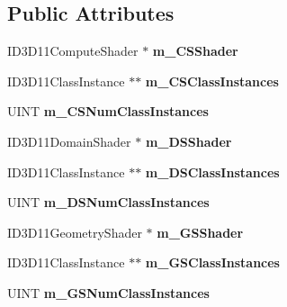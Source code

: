 \subsection*{Public Attributes}
\begin{DoxyCompactItemize}
\item 
\hypertarget{struct_c_state11_a2d2333895f9804b16bcd414340b2da76}{I\+D3\+D11\+Compute\+Shader $\ast$ {\bfseries m\+\_\+\+C\+S\+Shader}}\label{struct_c_state11_a2d2333895f9804b16bcd414340b2da76}

\item 
\hypertarget{struct_c_state11_aa87653245b4bbc7bca7fec6343c1655f}{I\+D3\+D11\+Class\+Instance $\ast$$\ast$ {\bfseries m\+\_\+\+C\+S\+Class\+Instances}}\label{struct_c_state11_aa87653245b4bbc7bca7fec6343c1655f}

\item 
\hypertarget{struct_c_state11_af0c0361e7e79cd0bc6e2a67eb7dd08e3}{U\+I\+N\+T {\bfseries m\+\_\+\+C\+S\+Num\+Class\+Instances}}\label{struct_c_state11_af0c0361e7e79cd0bc6e2a67eb7dd08e3}

\item 
\hypertarget{struct_c_state11_af554b1d699b2a78452c99a126875e962}{I\+D3\+D11\+Domain\+Shader $\ast$ {\bfseries m\+\_\+\+D\+S\+Shader}}\label{struct_c_state11_af554b1d699b2a78452c99a126875e962}

\item 
\hypertarget{struct_c_state11_a23379936690a0fe1f0a188cd2096b7f5}{I\+D3\+D11\+Class\+Instance $\ast$$\ast$ {\bfseries m\+\_\+\+D\+S\+Class\+Instances}}\label{struct_c_state11_a23379936690a0fe1f0a188cd2096b7f5}

\item 
\hypertarget{struct_c_state11_a4f4b34ba0426de374b54c4acafbe195c}{U\+I\+N\+T {\bfseries m\+\_\+\+D\+S\+Num\+Class\+Instances}}\label{struct_c_state11_a4f4b34ba0426de374b54c4acafbe195c}

\item 
\hypertarget{struct_c_state11_a7e8811f8c858fe86939e2c757d882da6}{I\+D3\+D11\+Geometry\+Shader $\ast$ {\bfseries m\+\_\+\+G\+S\+Shader}}\label{struct_c_state11_a7e8811f8c858fe86939e2c757d882da6}

\item 
\hypertarget{struct_c_state11_a70dc9f2093f101be9830965979aa8efb}{I\+D3\+D11\+Class\+Instance $\ast$$\ast$ {\bfseries m\+\_\+\+G\+S\+Class\+Instances}}\label{struct_c_state11_a70dc9f2093f101be9830965979aa8efb}

\item 
\hypertarget{struct_c_state11_a905f0ad89801e3b6fb22438a8bfaeb04}{U\+I\+N\+T {\bfseries m\+\_\+\+G\+S\+Num\+Class\+Instances}}\label{struct_c_state11_a905f0ad89801e3b6fb22438a8bfaeb04}


\end{DoxyCompactItemize}
